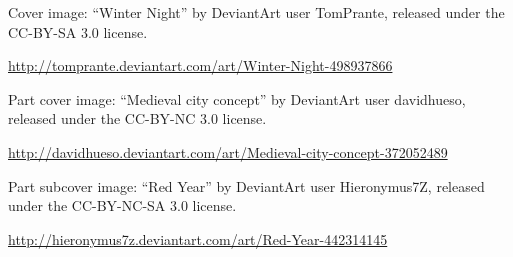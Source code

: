 \item Cover image: ``Winter Night'' by DeviantArt user TomPrante,
  released under the CC-BY-SA 3.0 license.

  \url{http://tomprante.deviantart.com/art/Winter-Night-498937866}

\item Part cover image: ``Medieval city concept'' by DeviantArt user davidhueso, released under the CC-BY-NC 3.0 license.

  \url{http://davidhueso.deviantart.com/art/Medieval-city-concept-372052489}

\item Part subcover image: ``Red Year'' by DeviantArt user Hieronymus7Z, released under the CC-BY-NC-SA 3.0 license.

  \url{http://hieronymus7z.deviantart.com/art/Red-Year-442314145}

